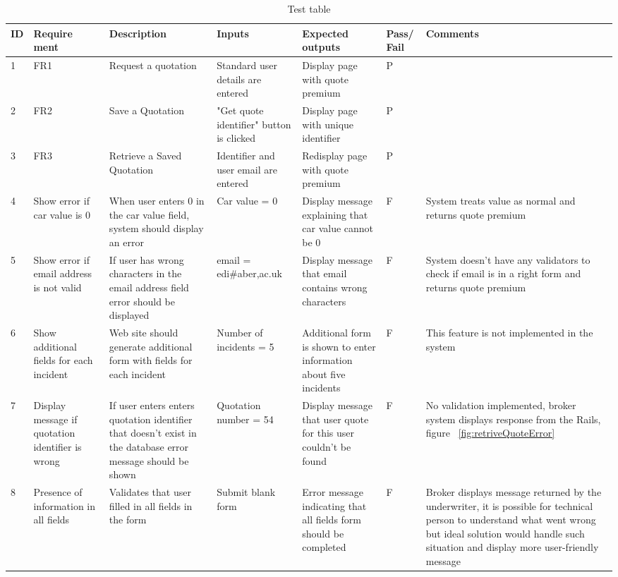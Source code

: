 \documentclass[10pt,a4paper,headinclude=true,twoside]{report}
\begin{document}
\begin{center}
\begin{table}


\begin{tabularx}{\textwidth} { |p{0.14cm}|p{0.88cm}|X|X|X|p{0.6cm}|X|}
   \hline                        
  ID &  Require ment & Description &  Inputs  &  Expected outputs & Pass/ Fail & Comments  \\ \hline
   1 & FR1 &  Request a quotation & Standard user details are entered &  Display page with quote premium & P &  \\ \hline
   2 & FR2 & Save a Quotation & "Get quote identifier" button is clicked &  Display page with unique identifier & P &  \\ \hline
   3 & FR3 & Retrieve a Saved Quotation & Identifier and user email are entered &  Redisplay page with quote premium & P & \\ \hline
   4 & Show error if car value is 0 & When user enters 0 in the car value field, system should display an error &  Car value = 0 &  Display message explaining that car value cannot be 0 & F & System treats value as normal and returns quote premium\\ \hline
   5 & Show error if email address is not valid & If user has wrong characters in the email address field error should be displayed& email = edi\#aber,ac.uk &  Display message that email contains wrong characters & F & System doesn't have any validators to check if email is in a right form and returns quote premium\\ \hline
   6 & Show additional fields for each incident & Web site should generate additional form with fields for each incident& Number of incidents = 5  &  Additional form is shown to enter information about five incidents & F & This feature is not implemented in the system\\ \hline
   7 & Display message if quotation identifier is wrong&  If user enters enters quotation identifier that doesn't exist in the database error message should be shown  &Quotation number = 54  &  Display message that user quote for this user couldn't be found & F & No validation implemented, broker system displays response from the Rails, figure ~\ref{fig:retriveQuoteError}\\ \hline
   8 & Presence of information in all fields &  Validates that user filled in all fields in the form &  Submit blank form & Error message indicating that all fields form should be completed & F & Broker displays message returned by the underwriter, it is possible for technical person to understand what went wrong but ideal solution would handle such situation and display more user-friendly message \\ \hline
   
   
   \hline  
   
\end{tabularx}
\caption{Test table}
\label{fig:testing}
\end{table}
\end{center}
\end{document}
